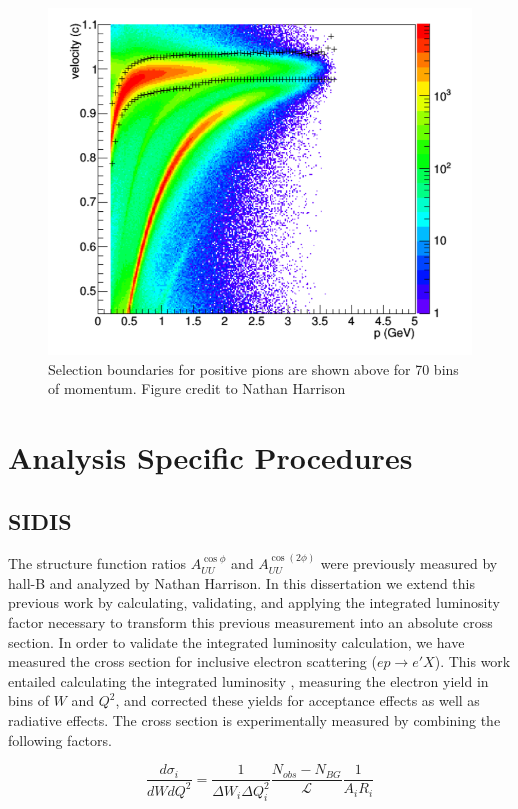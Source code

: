 \begin{figure}
  \centering 
  \includegraphics[width=12cm]{image/nathan-pip.png}
  \caption{Selection boundaries for positive pions are shown above for 70 bins of momentum.  Figure credit to Nathan Harrison \cite{theses-harrison:2015}}
\end{figure}

\section{Analysis Specific Procedures}

\subsection{SIDIS}
The structure function ratios $A_{UU}^{\cos\phi}$ and $A_{UU}^{\cos(2\phi)}$ were previously measured by hall-B and analyzed by Nathan Harrison.  In this dissertation we extend this previous work by calculating, validating, and applying the integrated luminosity factor necessary to transform this previous measurement into an absolute cross section.  In order to validate the integrated luminosity calculation, we have measured the cross section for inclusive electron scattering ($ep \rightarrow e'X$).  This work entailed calculating the integrated luminosity \cite{fcup-note}, measuring the electron yield in bins of $W$ and $Q^2$, and corrected these yields for acceptance effects as well as radiative effects.  The cross section is experimentally measured by combining the following factors. 

\begin{equation}
  \frac{d\sigma_i}{dW dQ^2} = \frac{1}{\Delta W_i \Delta Q^2_i} \frac{N_{obs} - N_{BG}}{\mathcal{L}} \frac{1}{A_i R_i}
\end{equation}

